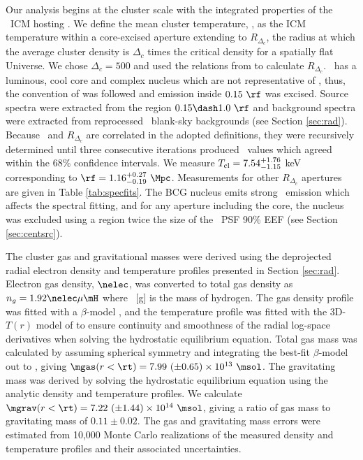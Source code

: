 \documentclass[useAMS,usenatbib]{mn2e}
\begin{document}
Our analysis begins at the cluster scale with the integrated
properties of the \rxj\ ICM hosting \irs. We define the mean cluster
temperature, \cltx, as the ICM temperature within a core-excised
aperture extending to $R_{\Delta_c}$, the radius at which the average
cluster density is $\Delta_c$ times the critical density for a
spatially flat Universe. We chose $\Delta_c = 500$ and used the
relations from \cite{2002A&A...389....1A} to calculate
$R_{\Delta_c}$. \rxj\ has a luminous, cool core and complex nucleus
which are not representative of \cltx, thus, the convention of
\citet{2007ApJ...668..772M} was followed and emission inside $0.15
~\rf$ was excised. Source spectra were extracted from the region $0.15
\dash 1.0~\rf$ and background spectra were extracted from reprocessed
\caldb\ blank-sky backgrounds (see Section \ref{sec:rad}). Because
\cltx\ and $R_{\Delta_c}$ are correlated in the adopted definitions,
they were recursively determined until three consecutive iterations
produced \cltx\ values which agreed within the 68\% confidence
intervals. We measure $T_{\mathrm{cl}} = 7.54^{+1.76}_{-1.15}$ keV corresponding
to $\rf = 1.16^{+0.27}_{-0.19}~\Mpc$. Measurements for other
$R_{\Delta_c}$ apertures are given in Table \ref{tab:specfits}. The
BCG nucleus emits strong \feka\ emission which affects the spectral
fitting, and for any aperture including the core, the nucleus was
excluded using a region twice the size of the \chandra\ PSF 90\% EEF
(see Section \ref{sec:centsrc}).

The cluster gas and gravitational masses were derived using the
deprojected radial electron density and temperature profiles presented
in Section \ref{sec:rad}. Electron gas density, $\nelec$, was
converted to total gas density as $n_g = 1.92 \nelec \mu \mH$ where
\mH\ [g] is the mass of hydrogen. The gas density profile was fitted
with a $\beta$-model \citep{betamodel}, and the temperature profile
was fitted with the 3D-$T(r)$ model of \citet{2006ApJ...640..691V} to
ensure continuity and smoothness of the radial log-space derivatives
when solving the hydrostatic equilibrium equation. Total gas mass was
calculated by assuming spherical symmetry and integrating the best-fit
$\beta$-model out to \rt, giving $\mgas(r<\rt) = 7.99 ~(\pm 0.65)
\times 10^{13} ~\msol$. The gravitating mass was derived by solving
the hydrostatic equilibrium equation using the analytic density and
temperature profiles. We calculate $\mgrav(r<\rt) = 7.22 ~(\pm 1.44)
\times 10^{14} ~\msol$, giving a ratio of gas mass to gravitating mass
of $0.11 \pm 0.02$. The gas and gravitating mass errors were estimated
from 10,000 Monte Carlo realizations of the measured density and
temperature profiles and their associated uncertainties.
\end{document}
